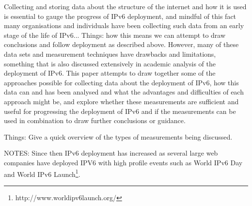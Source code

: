 Collecting and storing data about the structure of the internet and how it is
used is essential to gauge the progress of IPv6 deployment, and mindful of this
fact many organisations and individuals have been collecting such data from an
early stage of the life of IPv6... Things: how this means we can attempt to draw
conclusions and follow deployment as described above. However, many of these
data sets and measurement techniques have drawbacks and limitations, something
that is also discussed extensively in academic analysis of the deployment of
IPv6. This paper attempts to draw together some of the approaches possible for
collecting data about the deployment of IPv6, how this data can and has been
analysed and what the advantages and difficulties of each approach might be,
and explore whether these measurements are sufficient and useful for progressing
the deployment of IPv6 and if the measurements can be used in combination to
draw further conclusions or guidance.

Things: Give a quick overview of the types of measurements being discussed.


NOTES:
Since then IPv6 deployment has increased as several large web companies have
deployed IPV6 with high profile events such as World IPv6
Day and World IPv6 Launch\footnote[2]{http://www.worldipv6launch.org/}.



